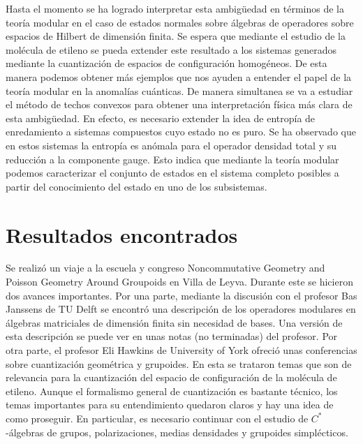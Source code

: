 \documentclass{article}
\begin{document}
Hasta el momento se ha logrado interpretar esta ambigüedad en términos de la teoría modular en el caso de estados normales sobre álgebras de operadores sobre espacios de Hilbert de dimensión finita. Se espera que mediante el estudio de la molécula de etileno\cite{Balachandran2013a} se pueda extender este resultado a los sistemas generados mediante la cuantización de espacios de configuración homogéneos. De esta manera podemos obtener más ejemplos que nos ayuden a entender el papel de la teoría modular en la anomalías cuánticas. De manera simultanea se va a estudiar el método de techos convexos para obtener una interpretación física más clara de esta ambigüedad\cite{Uhlmann2010}. En efecto, es necesario extender la idea de entropía de enredamiento a sistemas compuestos cuyo estado no es puro. Se ha observado que en estos sistemas la entropía es anómala para el operador densidad total y su reducción a la componente gauge. Esto indica que mediante la teoría modular podemos caracterizar el conjunto de estados en el sistema completo posibles a partir del conocimiento del estado en uno de los subsistemas.

\section{Resultados encontrados}

Se realizó un viaje a la escuela y congreso Noncommutative Geometry and Poisson Geometry Around Groupoids en Villa de Leyva. Durante este se hicieron dos avances importantes. Por una parte, mediante la discusión con el profesor Bas Janssens de TU Delft se encontró una descripción de los operadores modulares en álgebras matriciales de dimensión finita sin necesidad de bases. Una versión de esta descripción se puede ver en unas notas (no terminadas) del profesor\cite{Janssens2013}. Por otra parte, el profesor Eli Hawkins de University of York ofreció unas conferencias sobre cuantización geométrica y grupoides. En esta se trataron temas que son de relevancia para la cuantización del espacio de configuración de la molécula de etileno. Aunque el formalismo general de cuantización es bastante técnico, los temas importantes para su entendimiento quedaron claros y hay una idea de como proseguir.  En particular, es necesario continuar con el estudio de $C^*$-álgebras de grupos, polarizaciones, medias densidades y grupoides simplécticos.
\end{document}
